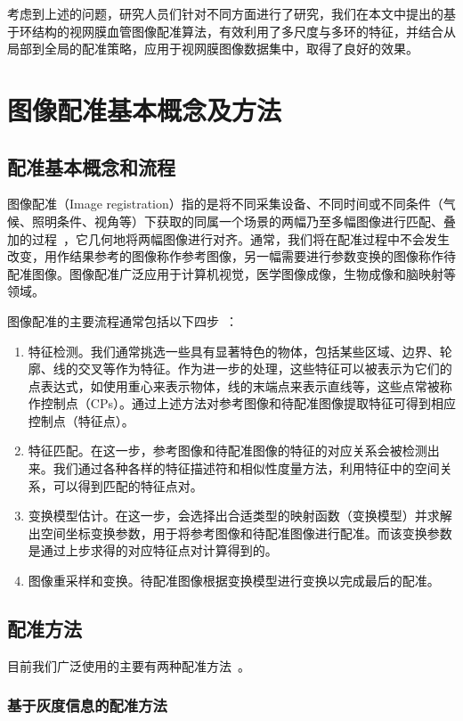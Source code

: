  考虑到上述的问题，研究人员们针对不同方面进行了研究，我们在本文中提出的基于环结构的视网膜血管图像配准算法，有效利用了多尺度与多环的特征，并结合从局部到全局的配准策略，应用于视网膜图像数据集中，取得了良好的效果。
 

\section{图像配准基本概念及方法}
\subsection{配准基本概念和流程}

图像配准（Image registration）指的是将不同采集设备、不同时间或不同条件（气候、照明条件、视角等）下获取的同属一个场景的两幅乃至多幅图像进行匹配、叠加的过程~\cite{brown}，它几何地将两幅图像进行对齐。通常，我们将在配准过程中不会发生改变，用作结果参考的图像称作参考图像，另一幅需要进行参数变换的图像称作待配准图像。图像配准广泛应用于计算机视觉，医学图像成像，生物成像和脑映射等领域。
 
图像配准的主要流程通常包括以下四步~\cite{zito}：
\begin{enumerate}
\item 特征检测。我们通常挑选一些具有显著特色的物体，包括某些区域、边界、轮廓、线的交叉等作为特征。作为进一步的处理，这些特征可以被表示为它们的点表达式，如使用重心来表示物体，线的末端点来表示直线等，这些点常被称作控制点（CPs）。通过上述方法对参考图像和待配准图像提取特征可得到相应控制点（特征点）。
\item 特征匹配。在这一步，参考图像和待配准图像的特征的对应关系会被检测出来。我们通过各种各样的特征描述符和相似性度量方法，利用特征中的空间关系，可以得到匹配的特征点对。
\item 变换模型估计。在这一步，会选择出合适类型的映射函数（变换模型）并求解出空间坐标变换参数，用于将参考图像和待配准图像进行配准。而该变换参数是通过上步求得的对应特征点对计算得到的。
\item 图像重采样和变换。待配准图像根据变换模型进行变换以完成最后的配准。
\end{enumerate}

\subsection{配准方法}
目前我们广泛使用的主要有两种配准方法~\cite{franc}。
\subsubsection{ 基于灰度信息的配准方法}

